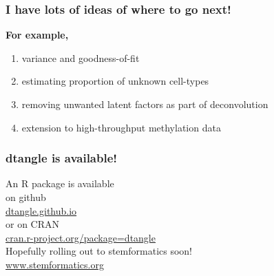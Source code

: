 \documentclass[usenames,dvipsnames,15pt]{beamer}
\newcommand{\backupbegin}{
   \newcounter{finalframe}
   \setcounter{finalframe}{\value{framenumber}}
}
\renewcommand{\alert}[1]{{\color{NavyBlue} #1}}
\begin{document}
\begin{frame}
  \frametitle{I have lots of ideas of where to go next!}
  {\bf For example,}
  \begin{enumerate}
  \item variance and goodness-of-fit 
  \item estimating proportion of unknown cell-types
  \item removing unwanted latent factors as part of deconvolution
  \item extension to high-throughput methylation data
  \end{enumerate}
\end{frame}

\begin{frame}
  \frametitle{dtangle is available!}
{\Large
  \begin{center}
    An R package is available\\on github\\
    \alert{\url{dtangle.github.io}}\\
    or on CRAN\\
    \alert{\url{cran.r-project.org/package=dtangle}}\\\vspace{1cm}
      Hopefully rolling out to stemformatics soon!\\
      \alert{\url{www.stemformatics.org}}

  \end{center}
}
\end{frame}

\backupbegin
\end{document}

